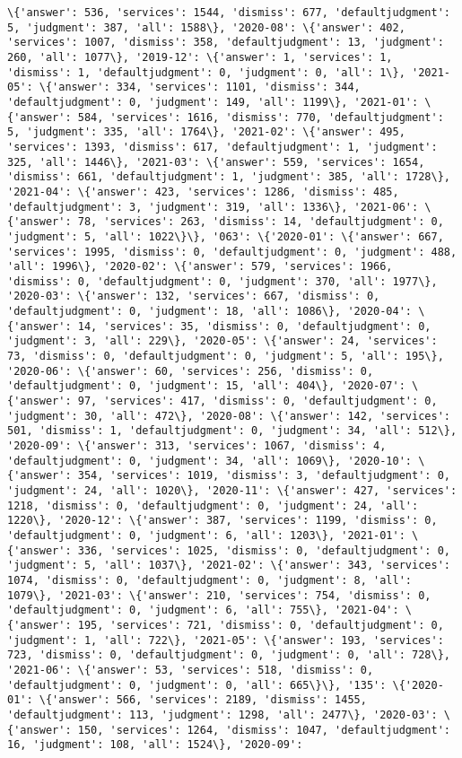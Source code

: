 \documentclass[11pt]{article}
\begin{document}
\begin{Verbatim}[commandchars=\\\{\}]
\{'answer': 536, 'services': 1544, 'dismiss': 677, 'defaultjudgment': 5, 'judgment': 387, 'all': 1588\}, '2020-08': \{'answer': 402, 'services': 1007, 'dismiss': 358, 'defaultjudgment': 13, 'judgment': 260, 'all': 1077\}, '2019-12': \{'answer': 1, 'services': 1, 'dismiss': 1, 'defaultjudgment': 0, 'judgment': 0, 'all': 1\}, '2021-05': \{'answer': 334, 'services': 1101, 'dismiss': 344, 'defaultjudgment': 0, 'judgment': 149, 'all': 1199\}, '2021-01': \{'answer': 584, 'services': 1616, 'dismiss': 770, 'defaultjudgment': 5, 'judgment': 335, 'all': 1764\}, '2021-02': \{'answer': 495, 'services': 1393, 'dismiss': 617, 'defaultjudgment': 1, 'judgment': 325, 'all': 1446\}, '2021-03': \{'answer': 559, 'services': 1654, 'dismiss': 661, 'defaultjudgment': 1, 'judgment': 385, 'all': 1728\}, '2021-04': \{'answer': 423, 'services': 1286, 'dismiss': 485, 'defaultjudgment': 3, 'judgment': 319, 'all': 1336\}, '2021-06': \{'answer': 78, 'services': 263, 'dismiss': 14, 'defaultjudgment': 0, 'judgment': 5, 'all': 1022\}\}, '063': \{'2020-01': \{'answer': 667, 'services': 1995, 'dismiss': 0, 'defaultjudgment': 0, 'judgment': 488, 'all': 1996\}, '2020-02': \{'answer': 579, 'services': 1966, 'dismiss': 0, 'defaultjudgment': 0, 'judgment': 370, 'all': 1977\}, '2020-03': \{'answer': 132, 'services': 667, 'dismiss': 0, 'defaultjudgment': 0, 'judgment': 18, 'all': 1086\}, '2020-04': \{'answer': 14, 'services': 35, 'dismiss': 0, 'defaultjudgment': 0, 'judgment': 3, 'all': 229\}, '2020-05': \{'answer': 24, 'services': 73, 'dismiss': 0, 'defaultjudgment': 0, 'judgment': 5, 'all': 195\}, '2020-06': \{'answer': 60, 'services': 256, 'dismiss': 0, 'defaultjudgment': 0, 'judgment': 15, 'all': 404\}, '2020-07': \{'answer': 97, 'services': 417, 'dismiss': 0, 'defaultjudgment': 0, 'judgment': 30, 'all': 472\}, '2020-08': \{'answer': 142, 'services': 501, 'dismiss': 1, 'defaultjudgment': 0, 'judgment': 34, 'all': 512\}, '2020-09': \{'answer': 313, 'services': 1067, 'dismiss': 4, 'defaultjudgment': 0, 'judgment': 34, 'all': 1069\}, '2020-10': \{'answer': 354, 'services': 1019, 'dismiss': 3, 'defaultjudgment': 0, 'judgment': 24, 'all': 1020\}, '2020-11': \{'answer': 427, 'services': 1218, 'dismiss': 0, 'defaultjudgment': 0, 'judgment': 24, 'all': 1220\}, '2020-12': \{'answer': 387, 'services': 1199, 'dismiss': 0, 'defaultjudgment': 0, 'judgment': 6, 'all': 1203\}, '2021-01': \{'answer': 336, 'services': 1025, 'dismiss': 0, 'defaultjudgment': 0, 'judgment': 5, 'all': 1037\}, '2021-02': \{'answer': 343, 'services': 1074, 'dismiss': 0, 'defaultjudgment': 0, 'judgment': 8, 'all': 1079\}, '2021-03': \{'answer': 210, 'services': 754, 'dismiss': 0, 'defaultjudgment': 0, 'judgment': 6, 'all': 755\}, '2021-04': \{'answer': 195, 'services': 721, 'dismiss': 0, 'defaultjudgment': 0, 'judgment': 1, 'all': 722\}, '2021-05': \{'answer': 193, 'services': 723, 'dismiss': 0, 'defaultjudgment': 0, 'judgment': 0, 'all': 728\}, '2021-06': \{'answer': 53, 'services': 518, 'dismiss': 0, 'defaultjudgment': 0, 'judgment': 0, 'all': 665\}\}, '135': \{'2020-01': \{'answer': 566, 'services': 2189, 'dismiss': 1455, 'defaultjudgment': 113, 'judgment': 1298, 'all': 2477\}, '2020-03': \{'answer': 150, 'services': 1264, 'dismiss': 1047, 'defaultjudgment': 16, 'judgment': 108, 'all': 1524\}, '2020-09': 
\end{Verbatim}
\end{document}
